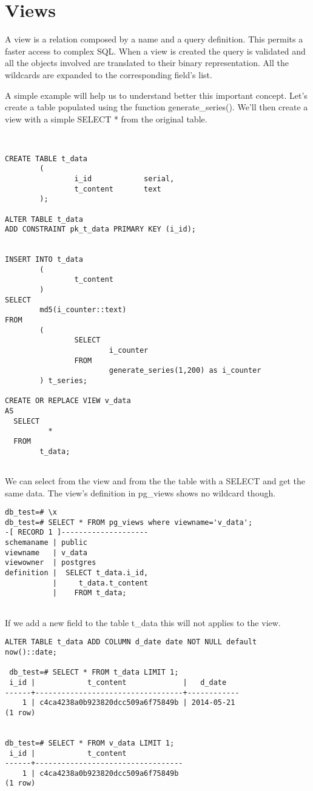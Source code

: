 \section{Views}
\label{sec:VIEWS}
A view is a relation composed by a name and a query definition. This permits a faster access to complex
SQL. When a view is created the query is validated and all the objects involved are translated to their
binary representation. All the wildcards are expanded to the corresponding field's list.\newline

A simple example will help us to understand better this important concept. Let's create a table
populated using the function generate\_series(). We'll then create a view with a simple SELECT * from the
original table.

\begin{lstlisting}[style=pgsql]


CREATE TABLE t_data 
        ( 
                i_id            serial,
                t_content       text
        );

ALTER TABLE t_data 
ADD CONSTRAINT pk_t_data PRIMARY KEY (i_id);


INSERT INTO t_data
        (
                t_content
        )
SELECT
        md5(i_counter::text)
FROM
        (
                SELECT
                        i_counter
                FROM
                        generate_series(1,200) as i_counter
        ) t_series;

CREATE OR REPLACE VIEW v_data 
AS 
  SELECT 
          *
  FROM 
        t_data;


\end{lstlisting}

We can select from the view and from the the table with a SELECT and get the same data. The view's
definition in pg\_views shows no wildcard though. 


\begin{lstlisting}[style=pgsql]
db_test=# \x
db_test=# SELECT * FROM pg_views where viewname='v_data';
-[ RECORD 1 ]--------------------
schemaname | public
viewname   | v_data
viewowner  | postgres
definition |  SELECT t_data.i_id,
           |     t_data.t_content
           |    FROM t_data;


\end{lstlisting}

If we add a new field to the table t\_data this will not applies to the view.

\begin{lstlisting}[style=pgsql]
 ALTER TABLE t_data ADD COLUMN d_date date NOT NULL default now()::date;
 
 db_test=# SELECT * FROM t_data LIMIT 1;
 i_id |            t_content             |   d_date   
------+----------------------------------+------------
    1 | c4ca4238a0b923820dcc509a6f75849b | 2014-05-21
(1 row)


db_test=# SELECT * FROM v_data LIMIT 1;
 i_id |            t_content             
------+----------------------------------
    1 | c4ca4238a0b923820dcc509a6f75849b
(1 row)


 
\end{lstlisting}

